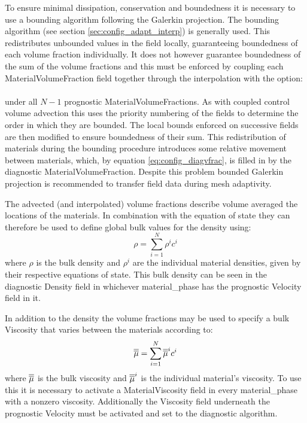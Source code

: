 To ensure minimal dissipation, conservation and boundedness it is necessary to use a bounding algorithm following the Galerkin projection.  The  bounding algorithm (see section \ref{sec:config_adapt_interp}) is generally used.  This redistributes unbounded values in the field locally, guaranteeing boundedness of each volume fraction individually.  It does not however guarantee boundedness of the sum of the volume fractions and this must be enforced by coupling each MaterialVolumeFraction field together through the interpolation with the option:\\
\\
under all $N-1$ prognostic MaterialVolumeFractions.  As with coupled control volume advection this uses the priority numbering of the fields to determine the order in which they are bounded.  The local bounds enforced on successive fields are then modified to ensure boundedness of their sum.  This redistribution of materials during the bounding procedure introduces some relative movement between materials, which, by equation \ref{eq:config_diagvfrac}, is filled in by the diagnostic MaterialVolumeFraction.  Despite this problem bounded Galerkin projection is recommended to transfer field data during mesh adaptivity.

The advected (and interpolated) volume fractions describe volume averaged the locations of the materials.  In combination with the equation of state they can therefore be used to define global bulk values for the density using:
\begin{equation}
\rho = \sum_{i=1}^N\rho^ic^i
\end{equation}
where $\rho$ is the bulk density and $\rho^i$ are the individual material densities, given by their respective equations of state.  This bulk density can be seen in the diagnostic Density field in whichever material\_phase has the prognostic Velocity field in it.

In addition to the density the volume fractions may be used to specify a bulk Viscosity that varies between the materials according to:
\begin{equation}
\overline{\overline{\mu}} = \sum_{i=1}^N\overline{\overline{\mu}}^ic^i
\end{equation}
where $\overline{\overline{\mu}}$ is the bulk viscosity and $\overline{\overline{\mu}}^i$ is the individual material's viscosity.  To use this it is necessary to activate a MaterialViscosity field in every material\_phase with a nonzero viscosity.  Additionally the Viscosity field underneath the prognostic Velocity must be activated and set to the  diagnostic algorithm.

